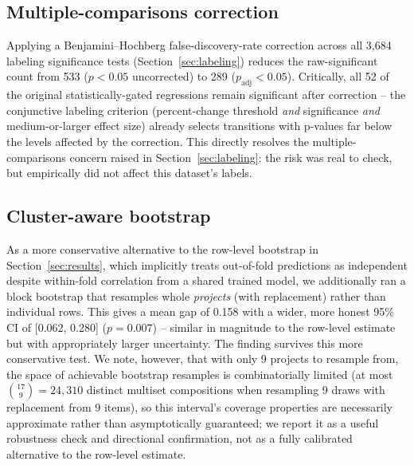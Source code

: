 \documentclass[preprint,12pt]{elsarticle}
\begin{document}
\subsection{Multiple-comparisons correction}
\label{sec:bhresults}
Applying a Benjamini--Hochberg false-discovery-rate correction across all 3{,}684 labeling significance tests (Section~\ref{sec:labeling}) reduces the raw-significant count from 533 ($p<0.05$ uncorrected) to 289 ($p_{\mathrm{adj}}<0.05$). Critically, all 52 of the original statistically-gated regressions remain significant after correction -- the conjunctive labeling criterion (percent-change threshold \emph{and} significance \emph{and} medium-or-larger effect size) already selects transitions with p-values far below the levels affected by the correction. This directly resolves the multiple-comparisons concern raised in Section~\ref{sec:labeling}: the risk was real to check, but empirically did not affect this dataset's labels.

\subsection{Cluster-aware bootstrap}
\label{sec:clusterboot}
As a more conservative alternative to the row-level bootstrap in Section~\ref{sec:results}, which implicitly treats out-of-fold predictions as independent despite within-fold correlation from a shared trained model, we additionally ran a block bootstrap that resamples whole \emph{projects} (with replacement) rather than individual rows. This gives a mean gap of 0.158 with a wider, more honest 95\% CI of [0.062, 0.280] ($p=0.007$) -- similar in magnitude to the row-level estimate but with appropriately larger uncertainty. The finding survives this more conservative test. We note, however, that with only 9 projects to resample from, the space of achievable bootstrap resamples is combinatorially limited (at most $\binom{17}{9}=24{,}310$ distinct multiset compositions when resampling 9 draws with replacement from 9 items), so this interval's coverage properties are necessarily approximate rather than asymptotically guaranteed; we report it as a useful robustness check and directional confirmation, not as a fully calibrated alternative to the row-level estimate.
\end{document}
